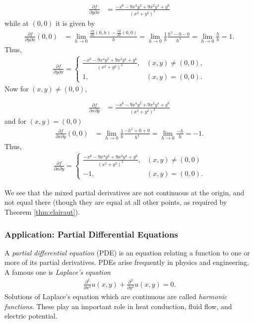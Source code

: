 \documentclass[12pt,letterpaper,reqno]{article}
\numberwithin{equation}{section}
\begin{document}
{\begin{example}
\begin{align*}
	\frac{\partial f}{\partial y \partial x}&=\frac{-x^6-9x^4y^2+9x^2y^4+y^6}{(x^2+y^2)^3}
\end{align*}
while at $(0,0)$ it is given by
\begin{align*}
	\frac{\partial f}{\partial y \partial x}(0,0)&=\lim_{h \to 0}\frac{\frac{\partial f}{\partial x}(0,h)-\frac{\partial f}{\partial x}(0,0)}{h}=\lim_{h \to 0}\frac{1}{h}\frac{h^5-0-0}{h^4}=\lim_{h \to 0}\frac{h}{h}=1.
\end{align*}
Thus,
\begin{align*}
	\frac{\partial f}{\partial y \partial x}=\begin{cases}
		\frac{-x^6-9x^4y^2+9x^2y^4+y^6}{(x^2+y^2)^3}, &(x,y) \neq (0,0), \\
		1, &(x,y)=(0,0).
	\end{cases}
\end{align*}
Now for $(x,y) \neq (0,0)$,

\begin{align*}
	\frac{\partial f}{\partial x \partial y}&=\frac{-x^6-9x^4y^2+9x^2y^4+y^6}{(x^2+y^2)^3}
\end{align*} 
and for $(x,y)=(0,0)$
\begin{align*}
	\frac{\partial f}{\partial x \partial y}(0,0)&=\lim_{h \to 0}\frac{1}{h}\frac{-h^5+0+0}{h^4}=\lim_{h \to 0}\frac{-h}{h}=-1. 
\end{align*}
Thus,
\begin{align*}
	\frac{\partial f}{\partial x \partial y}=\begin{cases}
		\frac{-x^6-9x^4y^2+9x^2y^4+y^6}{(x^2+y^2)^3}, &(x,y) \neq (0,0) \\
		-1, &(x,y)=(0,0).
	\end{cases}
\end{align*}

We see that the mixed partial derivatives are not continuous at the origin, and not equal there (though they are equal at all other points, as required by Theorem \ref{thm:clairaut}). 
\end{example}


\subsubsection{Application: Partial Differential Equations}
A \emph{partial differential equation} (PDE) is an equation relating a function to one or more of its partial derivatives. PDEs arise frequently in physics and engineering. A famous one is \emph{Laplace's equation}
\begin{align*}
	\frac{\partial^2}{\partial x^2}u(x,y)+\frac{\partial^2}{\partial y^2}u(x,y)=0.
\end{align*}
Solutions of Laplace's equation which are continuous are called \emph{harmonic functions}. These play an important role in heat conduction, fluid flow, and electric potential.

}
\end{document}
